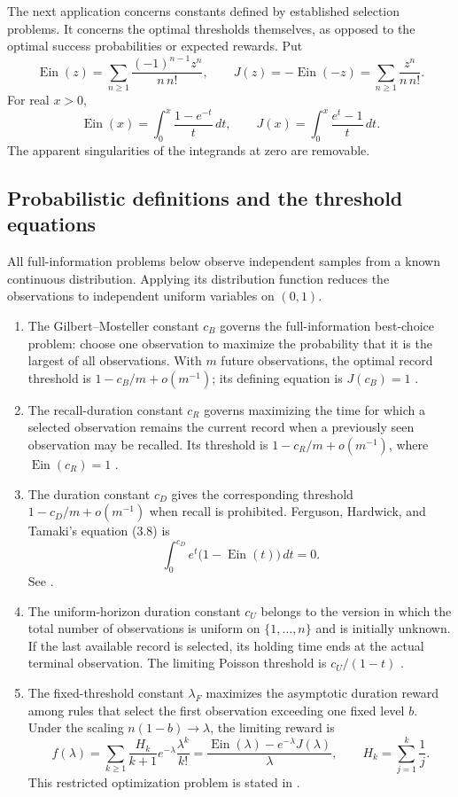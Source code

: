 \documentclass[11pt,a4paper]{article}
\DeclareMathOperator{\Ein}{Ein}
\theoremstyle{definition}
\theoremstyle{remark}
\numberwithin{equation}{section}
\begin{document}
The next application concerns constants defined by established selection
problems. It concerns the optimal thresholds themselves, as opposed to
the optimal success probabilities or expected rewards.
Put
\[
 \Ein(z)
     =\sum_{n\ge1}\frac{(-1)^{n-1}z^n}{n\,n!},\qquad
 J(z)=-\Ein(-z)=\sum_{n\ge1}\frac{z^n}{n\,n!}.
\]
For real $x>0$,
\[
 \Ein(x)=\int_0^x\frac{1-e^{-t}}t\,dt,
 \qquad
 J(x)=\int_0^x\frac{e^t-1}t\,dt.
\]
The apparent singularities of the integrands at zero are removable.

\subsection{Probabilistic definitions and the threshold equations}

All full-information problems below observe independent samples from a
known continuous distribution. Applying its distribution function reduces
the observations to independent uniform variables on $(0,1)$.
\begin{enumerate}
\item
The Gilbert--Mosteller constant $c_B$ governs the full-information
best-choice problem: choose one observation to maximize the probability
that it is the largest of all observations. With $m$ future observations,
the optimal record threshold is $1-c_B/m+o(m^{-1})$; its defining
equation is $J(c_B)=1$ \cite{GM1966,Gnedin}.
\item
The recall-duration constant $c_R$ governs maximizing the time for which
a selected observation remains the current record when a previously seen
observation may be recalled. Its threshold is
$1-c_R/m+o(m^{-1})$, where $\Ein(c_R)=1$
\cite[Theorem 5 and the following asymptotic calculation]{FHT1992}.
\item
The duration constant $c_D$ gives the corresponding threshold
$1-c_D/m+o(m^{-1})$ when recall is prohibited.
Ferguson, Hardwick, and Tamaki's equation (3.8) is
\begin{equation}\label{opt:eq:duration-integral}
       \int_0^{c_D}e^t\bigl(1-\Ein(t)\bigr)\,dt=0.
\end{equation}
See \cite[Theorem 4 and equation (3.8)]{FHT1992}.
\item
The uniform-horizon duration constant $c_U$ belongs to the version in
which the total number of observations is uniform on
$\{1,\ldots,n\}$ and is initially unknown. If the last available record
is selected, its holding time ends at the actual terminal observation.
The limiting Poisson threshold is $c_U/(1-t)$
\cite[Theorem 2.1(c), equation (1)]{Tamaki2013}.
\item
The fixed-threshold constant $\lambda_F$ maximizes the asymptotic
duration reward among rules that select the first observation exceeding
one fixed level $b$. Under the scaling $n(1-b)\to\lambda$, the limiting
reward is
\begin{equation}\label{opt:eq:fixed-utility}
 f(\lambda)
 =\sum_{k\ge1}\frac{H_k}{k+1}e^{-\lambda}\frac{\lambda^k}{k!}
 =\frac{\Ein(\lambda)-e^{-\lambda}J(\lambda)}{\lambda},
 \qquad H_k=\sum_{j=1}^k\frac1j.
\end{equation}
This restricted optimization problem is stated in
\cite[Section 4, Remark]{Tamaki2013}.
\end{enumerate}
\end{document}

